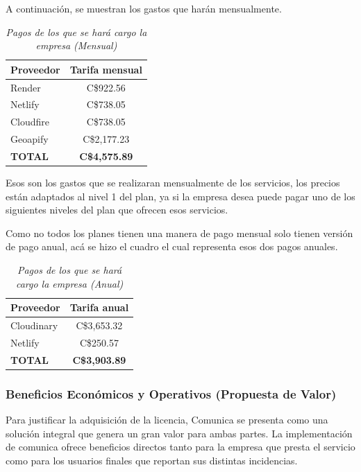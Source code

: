 \newpage

A continuación, se muestran los gastos que harán mensualmente.

\begin{table}[htbp]
	\centering
	\caption{\emph{Pagos de los que se hará cargo la empresa (Mensual)}}
	\label{tab:pagos_mensuales}
	\begin{tabularx}{\textwidth}{X c}
		\toprule
		\textbf{Proveedor} & \textbf{Tarifa mensual} \\
		\midrule
		Render & C\$922.56 \\
		Netlify & C\$738.05 \\
		Cloudfire & C\$738.05 \\
		Geoapify & C\$2,177.23 \\
		\midrule
		\textbf{TOTAL} & \textbf{C\$4,575.89} \\
		\bottomrule
	\end{tabularx}
\end{table}

Esos son los gastos que se realizaran mensualmente de los servicios, los precios están adaptados al nivel 1 del plan, ya si la empresa desea puede pagar uno de los siguientes niveles del plan que ofrecen esos servicios.

Como no todos los planes tienen una manera de pago mensual solo tienen versión de pago anual, acá se hizo el cuadro el cual representa esos dos pagos anuales.

\begin{table}[htbp]
	\centering
	\caption{\emph{Pagos de los que se hará cargo la empresa (Anual)}}
	\label{tab:pagos_anuales}
	\begin{tabularx}{\textwidth}{X c}
		\toprule
		\textbf{Proveedor} & \textbf{Tarifa anual} \\
		\midrule
		Cloudinary & C\$3,653.32 \\
		Netlify & C\$250.57 \\
		\midrule
		\textbf{TOTAL} & \textbf{C\$3,903.89} \\
		\bottomrule
	\end{tabularx}
\end{table}

\newpage

\subsubsection{Beneficios Económicos y Operativos (Propuesta de Valor)}
Para justificar la adquisición de la licencia, Comunica se presenta como una solución integral que genera un gran valor para ambas partes. La implementación de comunica ofrece beneficios directos tanto para la empresa que presta el servicio como para los usuarios finales que reportan sus distintas incidencias.

